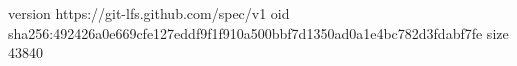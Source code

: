 version https://git-lfs.github.com/spec/v1
oid sha256:492426a0e669cfe127eddf9f1f910a500bbf7d1350ad0a1e4bc782d3fdabf7fe
size 43840
